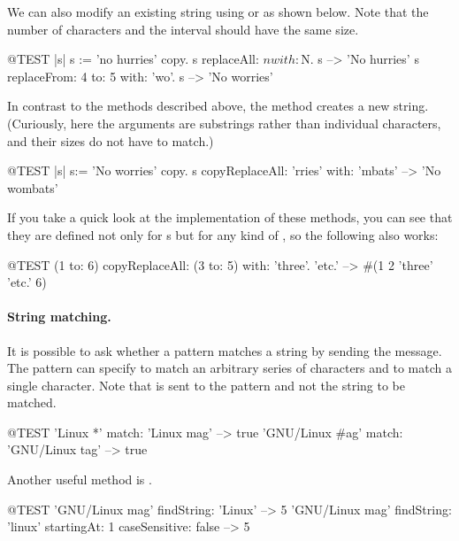 \documentclass[a4paper,10pt,twoside]{book}
\begin{document}
We can also modify an existing string using  or  as shown below. Note that the number of characters and the interval should have the same size.

\begin{code}{@TEST |s| s := 'no hurries' copy.}
s replaceAll: $n with: $N.
s --> 'No hurries'
s replaceFrom: 4 to: 5 with: 'wo'.
s --> 'No worries'
\end{code}

In contrast to the methods described above, the method  creates a new string.
(Curiously, here the arguments are substrings rather than individual characters, and their sizes do not have to match.)

\begin{code}{@TEST |s| s:= 'No worries' copy.}
s copyReplaceAll: 'rries' with: 'mbats' --> 'No wombats'
\end{code}

If you take a quick look at the implementation of these methods, you can see that they are defined not only for s but for any kind of , so the following also works:

\begin{code}{@TEST}
(1 to: 6) copyReplaceAll: (3 to: 5) with: {'three'. 'etc.'} --> #(1 2 'three' 'etc.' 6)
\end{code}

\paragraph{String matching.}
It is possible to ask whether a pattern matches a string by sending the  message.
The pattern can specify \ct{*} to match an arbitrary series of characters and \ct{\#} to match a single character.
Note that  is sent to the pattern and not the string to be matched.
\begin{code}{@TEST}
'Linux *' match: 'Linux mag'                      --> true
'GNU/Linux #ag' match: 'GNU/Linux tag' --> true
\end{code}

Another useful method is .
\begin{code}{@TEST}
'GNU/Linux mag' findString: 'Linux'                                                      --> 5
'GNU/Linux mag' findString: 'linux' startingAt: 1 caseSensitive: false  --> 5
\end{code}
\end{document}
